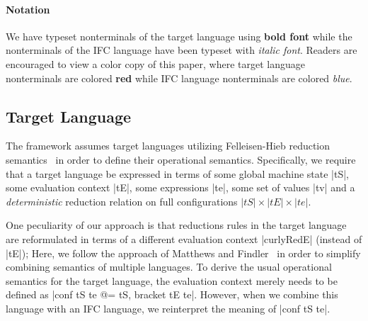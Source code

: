 
\paragraph{Notation}
We have typeset nonterminals of the target language using \textbf{{\color{red}
bold font}} while the nonterminals of the IFC language have been typeset
with \textit{{\color{blue} italic font}}.  Readers are encouraged to view
a color copy of this paper, where target language nonterminals are colored \textbf{{\color{red} red}}
while IFC language nonterminals are colored \textit{{\color{blue} blue}}.

\subsection{Target Language}

The framework assumes target languages utilizing
Felleisen-Hieb reduction semantics~\cite{Felleisen:1992:RRS:136293.136297} in
order to define their operational semantics. Specifically, we require that a
target language be expressed in terms of some global machine state |tS|, some
evaluation context |tE|, some expressions |te|, some set of values |tv| and a
\emph{deterministic} reduction relation on full configurations $|tS| \times |tE|
\times |te|$.

One peculiarity of our approach is that reductions rules in the target language
are reformulated in terms of a different evaluation context |curlyRedE| (instead
of |tE|); Here,
we follow the approach of Matthews and
Findler~\cite{Matthews:2007:OSM:1190216.1190220} in order to simplify combining
semantics of multiple languages. To derive the usual operational semantics for
the target language, the evaluation context merely needs to be defined as |conf
tS te @= tS, bracket tE te|.  However, when we combine this language with an IFC
language, we reinterpret the meaning of |conf tS te|.



